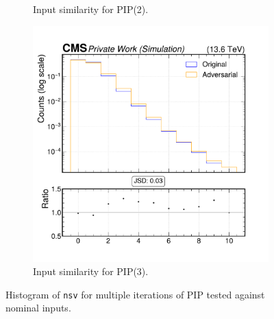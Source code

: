 \begin{figure}[h]
\begin{subfigure}[t]{0.32\textwidth}
    \caption{Input similarity for PIP(2).}
  \end{subfigure}\hfill
  \begin{subfigure}[t]{0.32\textwidth}
    \includegraphics[width=\linewidth]{media/output/features/compare/intprob_3/cmp_global_features_nsv.pdf}
    \caption{Input similarity for PIP(3).}
  \end{subfigure}

  \caption{Histogram of \texttt{nsv} for multiple iterations of PIP tested against nominal inputs.}
  \label{fig:intprob_input_nsv}
\end{figure}
